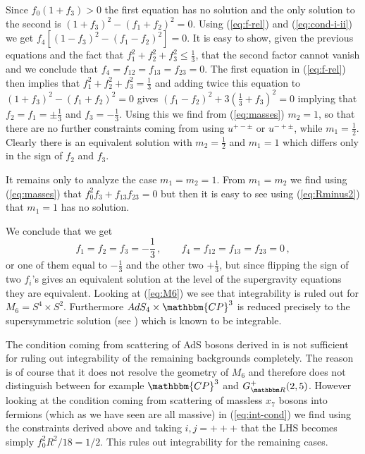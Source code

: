 \documentclass[a4paper,11pt]{article}
\begin{document}
Since $f_0(1+f_3)>0$ the first equation has no solution and the only solution to the second is $(1+f_3)^2-(f_1+f_2)^2=0$. Using (\ref{eq:f-rel}) and (\ref{eq:cond-i-ii}) we get $f_4[(1-f_3)^2-(f_1-f_2)^2]=0$. It is easy to show, given the previous equations and the fact that $f_1^2+f_2^2+f_3^2\leq\frac13$, that the second factor cannot vanish and we conclude that $f_4=f_{12}=f_{13}=f_{23}=0$. The first equation in (\ref{eq:f-rel}) then implies that $f_1^2+f_2^2+f_3^2=\frac13$ and adding twice this equation to $(1+f_3)^2-(f_1+f_2)^2=0$ gives $(f_1-f_2)^2+3(\frac13+f_3)^2=0$ implying that $f_2=f_1=\pm\frac13$ and $f_3=-\frac13$. Using this we find from (\ref{eq:masses}) $m_2=1$, so that there are no further constraints coming from using $u^{+-\pm}$ or $u^{-+\pm}$, while $m_1=\frac12$. Clearly there is an equivalent solution with $m_2=\frac12$ and $m_1=1$ which differs only in the sign of $f_2$ and $f_3$.

It remains only to analyze the case $m_1=m_2=1$. From $m_1=m_2$ we find using (\ref{eq:masses}) that $f_0^2f_3+f_{13}f_{23}=0$ but then it is easy to see using (\ref{eq:Rminus2}) that $m_1=1$ has no solution.

We conclude that we get 
\begin{equation}
f_1=f_2=f_3=-\frac13\,,\qquad f_4=f_{12}=f_{13}=f_{23}=0\,,
\end{equation}
or one of them equal to $-\frac13$ and the other two $+\frac13$, but since flipping the sign of two $f_i$'s gives an equivalent solution at the level of the supergravity equations they are equivalent. Looking at (\ref{eq:M6}) we see that integrability is ruled out for $M_6=S^4\times S^2$. Furthermore $AdS_4\times\mathbbm{CP}^3$ is reduced precisely to the supersymmetric solution (see \cite{Wulff:2017zbl}) which is known to be integrable.

The condition coming from scattering of AdS bosons derived in \cite{Wulff:2017lxh} is not sufficient for ruling out integrability of the remaining backgrounds completely. The reason is of course that it does not resolve the geometry of $M_6$ and therefore does not distinguish between for example $\mathbbm{CP}^3$ and $G_{\mathbbm R}^+(2,5)$. However looking at the condition coming from scattering of massless $x_7$ bosons into fermions (which as we have seen are all massive) in (\ref{eq:int-cond}) we find using the constraints derived above and taking $i,j=+++$ that the LHS becomes simply $f_0^2R^2/18=1/2$. This rules out integrability for the remaining cases.




{}
\end{document}
